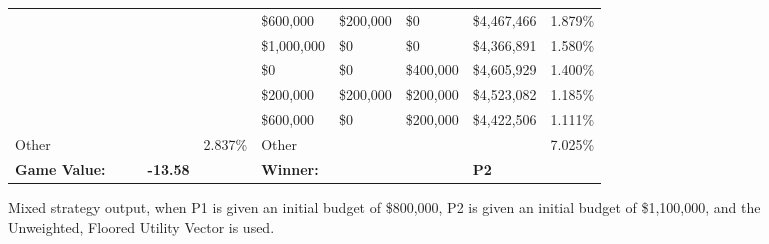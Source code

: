 \documentclass[11pt]{article}
\begin{document}
\begin{figure}
\begin{tabular}{ |p{1.0cm}p{1.0cm}p{1.0cm}p{2.0cm}|p{1.0cm}||p{1.0cm}p{1.0cm}p{1.0cm}p{2.0cm}|p{1.0cm}|}
& & & &                                                     & \$600,000 & \$200,000 & \$0 & \$4,467,466 & 1.879\% \\
& & & &                                                     & \$1,000,000 & \$0 & \$0 & \$4,366,891 & 1.580\% \\
& & & &                                                     & \$0 & \$0 & \$400,000 & \$4,605,929 & 1.400\% \\
& & & &                                                     & \$200,000 & \$200,000 & \$200,000 & \$4,523,082 & 1.185\% \\
& & & &                                                     & \$600,000 & \$0 & \$200,000 & \$4,422,506 & 1.111\% \\
\hline
Other & & & & 2.837\%                                       & Other & & & & 7.025\% \\
\hline
\small \textbf{Game Value:} &&& \small \textbf{-13.58} && \small \textbf{Winner:} &&& \small \textbf{P2}&\\
\hline
\end{tabular}
\caption{Mixed strategy output, when P1 is given an initial budget of \$800,000, P2 is given an initial budget of \$1,100,000, and the Unweighted, Floored Utility Vector is used.}
\label{8v11table.1}
\end{figure}
\end{document}
